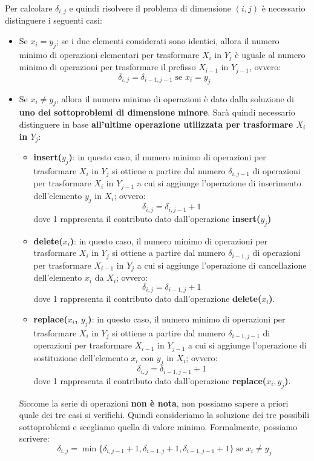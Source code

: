 \documentclass[12pt]{article}
\begin{document}
Per calcolare $\delta_{i,j}$ e quindi risolvere il problema di dimensione $(i,j)$ è necessario distinguere i seguenti casi:
\begin{itemize}
    \item Se $x_i = y_j$; se i due elementi considerati sono identici, allora il numero minimo di operazioni elementari per trasformare $X_i$ in $Y_j$ è uguale al numero minimo di operazioni
    per trasformare il prefisso $X_{i-1}$ in $Y_{j-1}$, ovvero:
    $$\delta_{i,j} = \delta_{i-1, j-1} \; \textrm{se } x_i = y_j$$
    \item Se $x_i \neq y_j$, allora il numero minimo di operazioni è dato dalla soluzione di \textbf{uno dei sottoproblemi di dimensione minore}. Sarà quindi necessario distinguere in base \textbf{all'ultime operazione utilizzata per trasformare $X_i$ in $Y_j$}:
    \begin{itemize}
        \item \textbf{insert($y_j$)}: in questo caso, il numero minimo di operazioni per trasformare $X_i$ in $Y_j$ si ottiene a partire dal numero $\delta_{i,j-1}$ di operazioni per trasformare $X_{i}$ in $Y_{j-1}$ a cui si aggiunge l'operazione di inserimento dell'elemento $y_j$ in $X_i$; ovvero:
        $$\delta_{i,j} = \delta_{i,j-1} + 1$$
        dove 1 rappresenta il contributo dato dall'operazione \textbf{insert($y_j$)}
        \item \textbf{delete($x_i$)}: in questo caso, il numero minimo di operazioni per trasformare $X_i$ in $Y_j$ si ottiene a partire dal numero $\delta_{i-1,j}$ di operazioni per trasformare $X_{i-1}$ in $Y_{j}$ a cui si aggiunge l'operazione di cancellazione dell'elemento $x_i$ da $X_i$; ovvero:
        $$\delta_{i,j} = \delta_{i-1,j} + 1$$
        dove 1 rappresenta il contributo dato dall'operazione \textbf{delete($x_i$)}.
        \item \textbf{replace($x_i$, $y_j$)}: in questo caso, il numero minimo di operazioni per trasformare $X_i$ in $Y_j$ si ottiene a partire dal numero $\delta_{i-1,j-1}$ di operazioni per trasformare $X_{i-1}$ in $Y_{j-1}$ a cui si aggiunge l'operazione di sostituzione dell'elemento $x_i$ con $y_j$ in $X_i$; ovvero:
        $$\delta_{i,j} = \delta_{i-1,j-1} + 1$$
        dove 1 rappresenta il contributo dato dall'operazione \textbf{replace($x_i, y_j$)}.
    \end{itemize}
    Siccome la serie di operazioni \textbf{non è nota}, non possiamo sapere a priori quale dei tre casi si verifichi.
    Quindi consideriamo la soluzione dei tre possibili sottoproblemi e scegliamo quella di valore minimo. Formalmente, possiamo scrivere:
    $$\delta_{i,j} = \min\{\delta_{i, j-1} + 1, \delta_{i-1, j} + 1, \delta_{i-1,j-1} + 1\} \; \textrm{se } x_i \neq y_j$$
\end{itemize}
\end{document}
